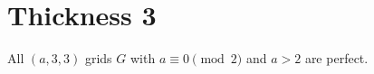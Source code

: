 \section{Thickness 3}

\begin{con}
\label{con:3x3xeven}
All $(a,3,3)$ grids $G$ with $a \equiv 0 \pmod 2$ and $a > 2$ are perfect. 
\end{con}

